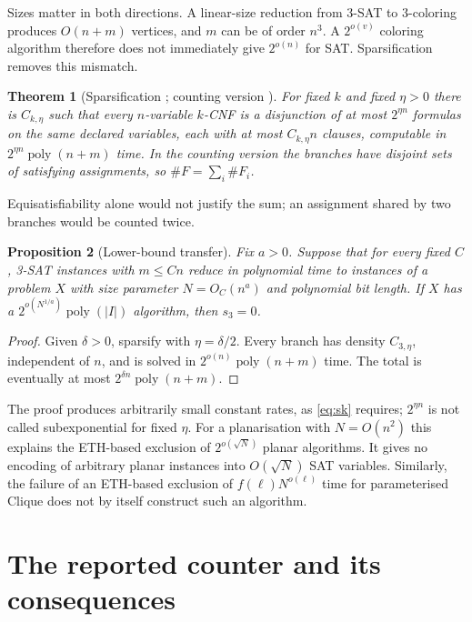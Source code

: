 \documentclass[11pt,reqno]{amsart}
\numberwithin{equation}{section}
\theoremstyle{plain}
\newtheorem{theorem}{Theorem}[section]
\newtheorem{proposition}[theorem]{Proposition}
\theoremstyle{definition}
\theoremstyle{remark}
\newcommand{\poly}{\operatorname{poly}}
\begin{document}
Sizes matter in both directions. A linear-size reduction from 3-SAT to
3-coloring produces $O(n+m)$ vertices, and $m$ can be of order $n^3$. A
$2^{o(v)}$ coloring algorithm therefore does not immediately give $2^{o(n)}$
for SAT. Sparsification removes this mismatch.

\begin{theorem}[Sparsification \cite{IPZ}; counting version \cite{DHM}]
\label{thm:sparsification}
For fixed $k$ and fixed $\eta>0$ there is $C_{k,\eta}$ such that every
$n$-variable $k$-CNF is a disjunction of at most $2^{\eta n}$ formulas on the
same declared variables, each with at most $C_{k,\eta}n$ clauses, computable
in $2^{\eta n}\poly(n+m)$ time. In the counting version the branches have
disjoint sets of satisfying assignments, so $\#F=\sum_i\#F_i$.
\end{theorem}
Equisatisfiability alone would not justify the sum; an assignment shared by
two branches would be counted twice.

\begin{proposition}[Lower-bound transfer]\label{prop:lower-transfer}
Fix $a>0$. Suppose that for every fixed $C$, 3-SAT instances with $m\le Cn$
reduce in polynomial time to instances of a problem $X$ with size parameter
$N=O_C(n^a)$ and polynomial bit length. If $X$ has a
$2^{o(N^{1/a})}\poly(|I|)$ algorithm, then $s_3=0$.
\end{proposition}
\begin{proof}
Given $\delta>0$, sparsify with $\eta=\delta/2$. Every branch has density
$C_{3,\eta}$, independent of $n$, and is solved in $2^{o(n)}\poly(n+m)$
time. The total is eventually at most $2^{\delta n}\poly(n+m)$.
\end{proof}
The proof produces arbitrarily small constant rates, as \eqref{eq:sk}
requires; $2^{\eta n}$ is not called subexponential for fixed $\eta$. For a
planarisation with $N=O(n^2)$ this explains the ETH-based exclusion of
$2^{o(\sqrt N)}$ planar algorithms. It gives no encoding of arbitrary planar
instances into $O(\sqrt N)$ SAT variables. Similarly, the failure of an
ETH-based exclusion of $f(\ell)N^{o(\ell)}$ time for parameterised Clique
\cite{Chen,LMS} does not by itself construct such an algorithm.


\part{The reported counter and its consequences}\label{part:consequences}
\end{document}
